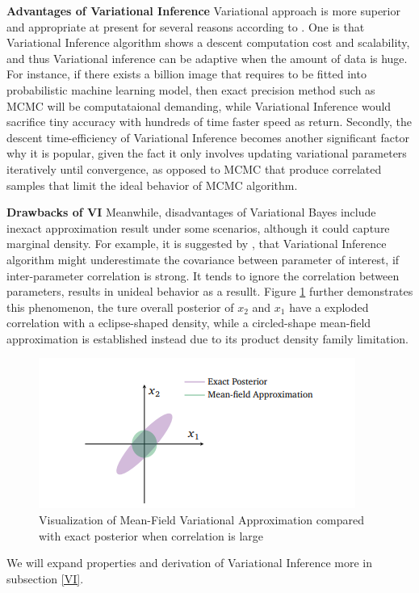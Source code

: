 \textbf{Advantages of Variational Inference}
Variational approach is more superior and appropriate at present for several reasons according to \cite{blei_kucukelbir_mcauliffe_2017}. One is that Variational Inference algorithm shows a descent computation cost and scalability, and thus Variational inference can be adaptive when the amount of data is huge. For instance, if there exists a billion image that requires to be fitted into probabilistic machine learning model, then exact precision method such as MCMC will be computataional demanding, while Variational Inference would sacrifice tiny accuracy with hundreds of time faster speed as return.
Secondly, the descent time-efficiency of Variational Inference becomes another significant factor why it is popular, given the fact it only involves updating variational parameters iteratively until convergence, as opposed to MCMC that produce correlated samples that limit the ideal behavior of MCMC algorithm.

\textbf{Drawbacks of VI}
Meanwhile, disadvantages of Variational Bayes include inexact approximation result under some scenarios, although it could capture marginal density. For example, it is suggested by \cite{blei_kucukelbir_mcauliffe_2017},
that Variational Inference algorithm might underestimate the covariance between parameter of interest, if inter-parameter correlation is strong. It tends to ignore the correlation between parameters, results in unideal behavior as a resullt. Figure \ref{fig:VIdemo}
further demonstrates this phenomenon, the ture overall posterior of $x_2$ and $x_1$ have a exploded correlation with a eclipse-shaped density, while a circled-shape mean-field approximation is established instead due to its product density family limitation.
\begin{figure}
	\includegraphics[width=\linewidth]{VIdemo}
	\caption{Visualization of Mean-Field Variational Approximation compared with exact posterior when correlation is large}
	\label{fig:VIdemo}
\end{figure}
We will expand properties and derivation of Variational Inference more in subsection \ref{VI}.

